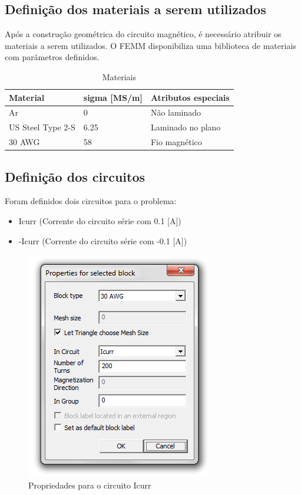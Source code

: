 \subsection{Definição dos materiais a serem utilizados}
Após a construção geométrica do circuito magnético, é necessário atribuir os materiais a serem utilizados. O FEMM disponibiliza uma biblioteca de materiais com parâmetros definidos.
\begin{table}[H]
\centering
\caption{Materiais}
\label{mat}
\begin{tabular}{lll}
\hline
\textbf{Material} & \textbf{sigma {[}MS/m{]}} & \textbf{Atributos especiais} \\ \hline
Ar                & 0                         & Não laminado                 \\
US Steel Type 2-S & 6.25                      & Laminado no plano            \\
30 AWG            & 58                        & Fio magnético                \\ \hline
\end{tabular}
\end{table}


\subsection{Definição dos circuitos}
Foram definidos dois circuitos para o problema:
\begin{itemize}
\item Icurr (Corrente do circuito série com 0.1 [A])
\item -Icurr (Corrente do circuito série com -0.1 [A])
\end{itemize}

\begin{figure}[H]
\centering
\includegraphics[scale=1]{img/assig1/circ_1.png}
\caption[Propriedades para o circuito Icurr]{Propriedades para o circuito Icurr}
\label{icurr_p}
\end{figure}

